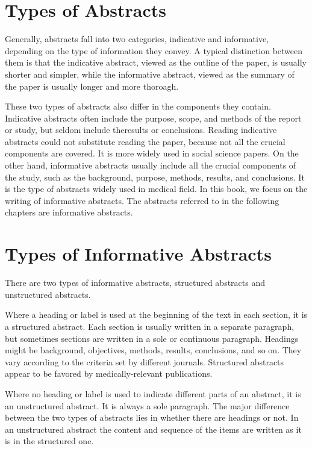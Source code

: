 \documentclass[a4paper]{ctexbook}
\begin{document}
\section{Types of Abstracts}

Generally, abstracts fall into two categories, indicative and informative, depending on the type of information they convey. A typical distinction between them is that the indicative abstract, viewed as the outline of the paper, is usually shorter and simpler, while the informative abstract, viewed as the summary of the paper is usually longer and more thoroagh. 

These two types of abstracts also differ in the components they contain. Indicative abstracts often include the purpose, scope, and methods of the report or study, but seldom include theresults or conclusions. Reading indicative abstracts could not substitute reading the paper, because not all the crucial components are covered. It is more widely used in social science papers. On the other hand, informative abstracts usually include all the crucial components of the study, such as the background, purpose, methods, results, and conclusions. It is the type of abstracts widely used in medical field. In this book, we focus on the writing of informative abstracts. The abstracts referred to in the following chapters are informative abstracts.

\section{Types of Informative Abstracts}

There are two types of informative abstracts, structured abstracts and unstructured abstracts.

Where a heading or label is used at the beginning of the text in each section, it is a structured abstract. Each section is usually written in a separate paragraph, but sometimes sections are written in a sole or continuous paragraph. Headings might be background, objectives, methods, results, conclusions, and so on. They vary according to the criteria set by different journals. Structured abstracts appear to be favored by medically-relevant publications.

Where no heading or label is used to indicate different parts of an abstract, it is an unstructured abstract. It is always a sole paragraph. The major difference between the two types of abstracts lies in whether there are headings or not. In an unstructured abstract the content and sequence of the items are written as it is in the structured one.
\end{document}
